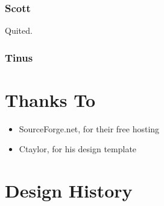 \documentclass[a4paper]{report}
\begin{document}
			\subsection{Scott}

				Quited.

			\subsection{Tinus}

	\chapter{Thanks To}
		
		\begin{itemize}
			\item SourceForge.net, for their free hosting
			\item Ctaylor, for his design template
		\end{itemize}

	\chapter{Design History}
\end{document}
